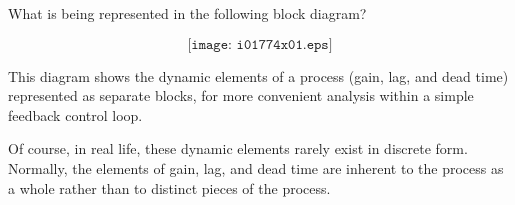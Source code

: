 

What is being represented in the following block diagram?

$$\texttt{[image: i01774x01.eps]}$$







This diagram shows the dynamic elements of a process (gain, lag, and dead time) represented as separate blocks, for more convenient analysis within a simple feedback control loop.







Of course, in real life, these dynamic elements rarely exist in discrete form.  Normally, the elements of gain, lag, and dead time are inherent to the process as a whole rather than to distinct pieces of the process.





